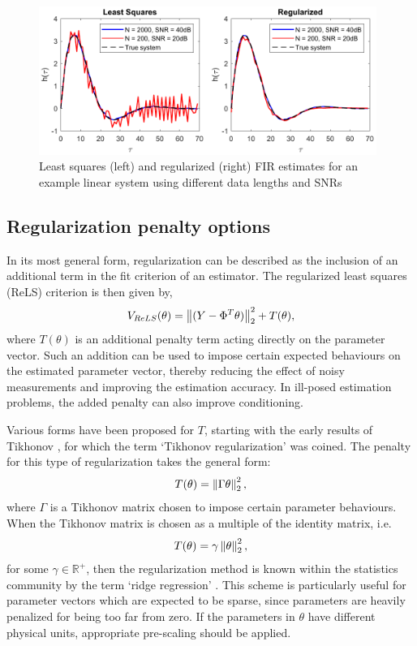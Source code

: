 \begin{figure}[h]
\centering
\includegraphics[width = 0.98\textwidth]{Chapter2_SysIDandControl/LS_example2}
\caption{Least squares (left) and regularized (right) FIR estimates for an example linear system using different data lengths and SNRs}
\label{fig:ExampleImpulseEsts}
\end{figure}

\subsection{Regularization penalty options}

In its most general form, regularization can be described as the inclusion of an additional term in the fit criterion of an estimator. The regularized least squares (ReLS) criterion is then given by,
\begin{equation}
V_{ReLS}(\theta) = \left\lVert(Y-\Phi^T \theta)\right\rVert_2^2 + T(\theta),
\end{equation} 
where $T(\theta)$ is an additional penalty term acting directly on the parameter vector. Such an addition can be used to impose certain expected behaviours on the estimated parameter vector, thereby reducing the effect of noisy measurements and improving the estimation accuracy. In ill-posed estimation problems, the added penalty can also improve conditioning.

Various forms have been proposed for $T$, starting with the early results of Tikhonov \cite{Tikhonov1963}, for which the term `Tikhonov regularization' was coined. The penalty for this type of regularization takes the general form:
\begin{equation}
T(\theta) = \left\lVert\Gamma \theta\right\rVert_2^2,
\label{eq:TikhonovPenalty}
\end{equation}  
where $\Gamma$ is a Tikhonov matrix chosen to impose certain parameter behaviours. When the Tikhonov matrix is chosen as a multiple of the identity matrix, i.e.
\begin{equation}
T(\theta) = \gamma \left\lVert\theta\right\rVert_2^2,
\end{equation}
for some $\gamma \in \mathbb{R}^+$, then the regularization method is known within the statistics community by the term `ridge regression' \cite{Hoerl1970}. This scheme is particularly useful for parameter vectors which are expected to be sparse, since parameters are heavily penalized for being too far from zero. If the parameters in $\theta$ have different physical units, appropriate pre-scaling should be applied.   

